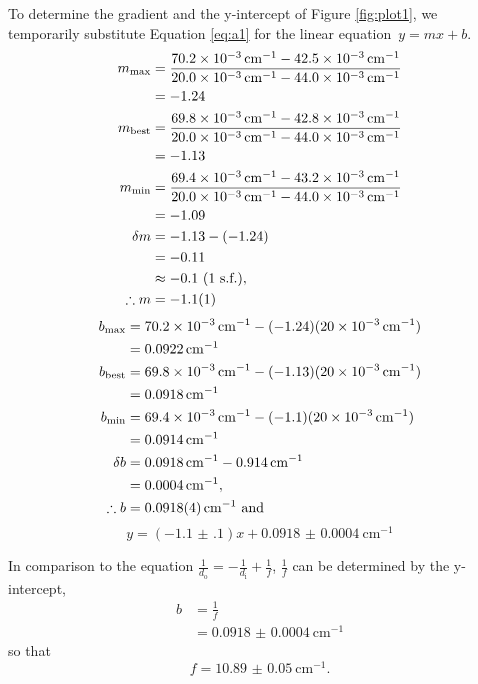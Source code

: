 \documentclass[letter,12pt]{article}
\numberwithin{equation}{section}
\numberwithin{figure}{section}
\numberwithin{table}{section}
\newcommand{\mdist}[1] {d_{\mathrm{#1}}}
\begin{document}
To determine the gradient and the y-intercept of Figure \ref{fig:plot1}, we temporarily substitute Equation \ref{eq:a1} for the linear equation~\(y = mx + b\).
\begin{align*}
  m_{\mathrm{max}} &= \frac{\SI{70.2d-3}{\cm^{-1}} - \SI{42.5d-3} {\cm^{-1}}}{\SI{20.0d-3}{\cm^{-1}} - \SI{44.0d-3}{\cm^{-1}}} \\
  &= -1.24 \\
  m_{\mathrm{best}} &= \frac{\SI{69.8d-3}{\cm^{-1}} - \SI{42.8d-3}{\cm^{-1}}}{\SI{20.0d-3}{\cm^{-1}} - \SI{44.0d-3}{\cm^{-1}}} \\ 
  &= -1.13 \\
  m_{\mathrm{min}} &= \frac{\SI{69.4d-3}{\cm^{-1}} - \SI{43.2d-3} {\cm^{-1}}}{\SI{20.0d-3}{\cm^{-1}} - \SI{44.0d-3}{\cm^{-1}}} \\
  &= -1.09 \\
  \delta m &= -1.13 - (-1.24) \\
  &= -0.11 \\
  &\approx -0.1 \ \text{(1 s.f.)}, \\
  \therefore m &= \num{-1.1(1)}
\end{align*} 
\begin{align*}
  b_{\mathrm{max}} &= \SI{70.2d-3}{\cm^{-1}} - (-1.24)(\SI{20d-3}{\cm^{-1}}) \\
  &= \SI{0.0922}{\cm^{-1}} \\
  b_{\mathrm{best}} &= \SI{69.8d-3}{\cm^{-1}} - (-1.13)(\SI{20d-3}{\cm^{-1}}) \\
  &= \SI{0.0918}{\cm^{-1}} \\
  b_{\mathrm{min}} &= \SI{69.4d-3}{\cm^{-1}} - (-1.1)(\SI{20d-3}{\cm^{-1}}) \\
  &= \SI{0.0914}{\cm^{-1}} \\
  \delta b &= \SI{0.0918}{\cm^{-1}} - \SI{0.914}{\cm^{-1}} \\
  &= \SI{0.0004}{\cm^{-1}}, \\
  \therefore b &= \SI{0.0918(4)}{\cm^{-1}} \ \text{and}
\end{align*}
\[y = (\num{-1.1(1)})x + \SI{0.0918(4)}{\cm^{-1}}\]

In comparison to the equation \(\frac{1}{\mdist{o}} = - \frac{1}{\mdist{i}} + \frac{1}{f}\), \(\frac{1}{f}\) can be determined by the y-intercept, 
\begin{align*}
  b &= \frac{1}{f} \\
  &= \SI{0.0918(4)}{\cm^{-1}}
\end{align*}
so that \[f = \SI{10.89(5)}{\cm^{-1}}.\]
\end{document}
